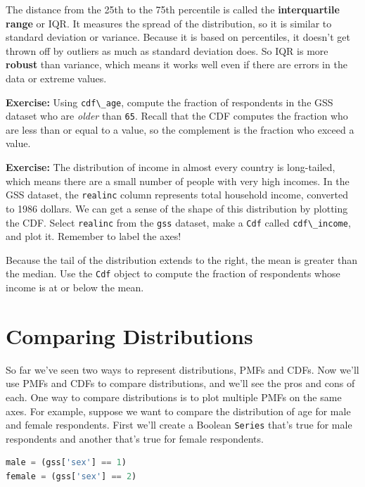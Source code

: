 \documentclass[
]{book}
\newcommand{\passthrough}[1]{#1}
\begin{document}
The distance from the 25th to the 75th percentile is called the
\textbf{interquartile range} or IQR. It measures the spread of the
distribution, so it is similar to standard deviation or variance.
Because it is based on percentiles, it doesn't get thrown off by
outliers as much as standard deviation does. So IQR is more
\textbf{robust} than variance, which means it works well even if there
are errors in the data or extreme values.

\textbf{Exercise:} Using \passthrough{\lstinline!cdf\_age!}, compute the
fraction of respondents in the GSS dataset who are \emph{older} than
\passthrough{\lstinline!65!}. Recall that the CDF computes the fraction
who are less than or equal to a value, so the complement is the fraction
who exceed a value.

\textbf{Exercise:} The distribution of income in almost every country is
long-tailed, which means there are a small number of people with very
high incomes. In the GSS dataset, the \passthrough{\lstinline!realinc!}
column represents total household income, converted to 1986 dollars. We
can get a sense of the shape of this distribution by plotting the CDF.
Select \passthrough{\lstinline!realinc!} from the
\passthrough{\lstinline!gss!} dataset, make a
\passthrough{\lstinline!Cdf!} called
\passthrough{\lstinline!cdf\_income!}, and plot it. Remember to label
the axes!

Because the tail of the distribution extends to the right, the mean is
greater than the median. Use the \passthrough{\lstinline!Cdf!} object to
compute the fraction of respondents whose income is at or below the
mean.

\section{Comparing Distributions}\label{comparing-distributions}

So far we've seen two ways to represent distributions, PMFs and CDFs.
Now we'll use PMFs and CDFs to compare distributions, and we'll see the
pros and cons of each. One way to compare distributions is to plot
multiple PMFs on the same axes. For example, suppose we want to compare
the distribution of age for male and female respondents. First we'll
create a Boolean \passthrough{\lstinline!Series!} that's true for male
respondents and another that's true for female respondents.

\begin{lstlisting}[language=Python]
male = (gss['sex'] == 1)
female = (gss['sex'] == 2)
\end{lstlisting}
\end{document}
